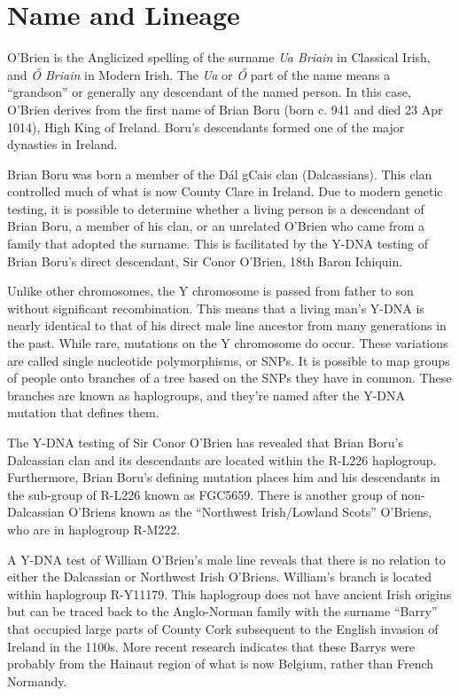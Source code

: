 \chapter{Name and Lineage}

O'Brien is the Anglicized spelling of the surname \textit{Ua Briain} in Classical Irish, and \textit{\'{O} Briain} in Modern Irish. The \textit{Ua} or \textit{\'{O}} part of the name means a ``grandson'' or generally any descendant of the named person. In this case, O'Brien derives from the first name of Brian Boru (born c. 941 and died 23 Apr 1014), High King of Ireland. Boru's descendants formed one of the major dynasties in Ireland.\cite{BoruHistorical}

Brian Boru was born a member of the D\'{a}l gCais clan (Dalcassians). This clan controlled much of what is now County Clare in Ireland.\cite{BoruEarlyHistory} Due to modern genetic testing, it is possible to determine whether a living person is a descendant of Brian Boru, a member of his clan, or an unrelated O'Brien who came from a family that adopted the surname. This is facilitated by the Y-DNA testing of Brian Boru's direct descendant, Sir Conor O'Brien, 18th Baron Ichiquin.\cite{GGI}

Unlike other chromosomes, the Y chromosome is passed from father to son without significant recombination. This means that a living man's Y-DNA is nearly identical to that of his direct male line ancestor from many generations in the past. While rare, mutations on the Y chromosome do occur. These variations are called single nucleotide polymorphisms, or SNPs. It is possible to map groups of people onto branches of a tree based on the SNPs they have in common. These branches are known as haplogroups, and they're named after the Y-DNA mutation that defines them.\cite{Bettinger}

The Y-DNA testing of Sir Conor O'Brien has revealed that Brian Boru's Dalcassian clan and its descendants are located within the R-L226 haplogroup. Furthermore, Brian Boru's defining mutation places him and his descendants in the sub-group of R-L226 known as FGC5659. There is another group of non-Dalcassian O'Briens known as the ``Northwest Irish/Lowland Scots'' O'Briens, who are in haplogroup R-M222.\cite{GGI}

A Y-DNA test of William O'Brien's male line\cite{BigY} reveals that there is no relation to either the Dalcassian or Northwest Irish O'Briens. William's branch is located within haplogroup R-Y11179. This haplogroup does not have ancient Irish origins but can be traced back to the Anglo-Norman family with the surname ``Barry'' that occupied large parts of County Cork subsequent to the English invasion of Ireland in the 1100s.\cite{BarrymoreDNA2} More recent research indicates that these Barrys were probably from the Hainaut region of what is now Belgium, rather than French Normandy.\cite{BarrymoreDNA}

